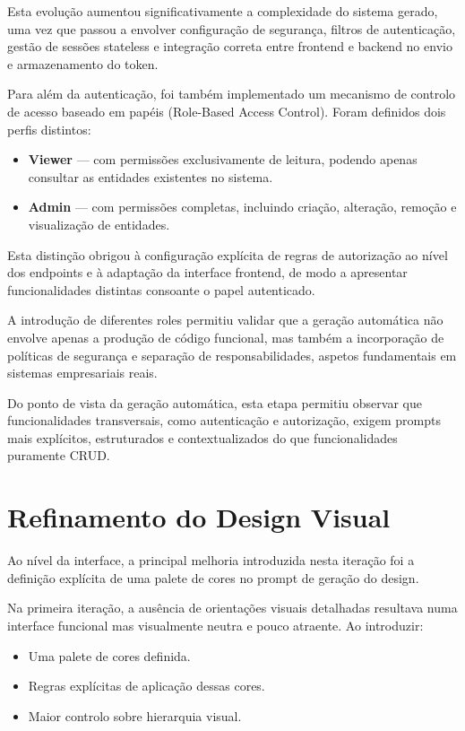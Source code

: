 Esta evolução aumentou significativamente a complexidade do sistema gerado, uma vez que passou a envolver configuração de segurança, filtros de autenticação, gestão de sessões stateless e integração correta entre frontend e backend no envio e armazenamento do token.

Para além da autenticação, foi também implementado um mecanismo de controlo de acesso baseado em papéis (Role-Based Access Control). Foram definidos dois perfis distintos:

\begin{itemize}
  \item \textbf{Viewer} — com permissões exclusivamente de leitura, podendo apenas consultar as entidades existentes no sistema.
  \item \textbf{Admin} — com permissões completas, incluindo criação, alteração, remoção e visualização de entidades.
\end{itemize}

Esta distinção obrigou à configuração explícita de regras de autorização ao nível dos endpoints e à adaptação da interface frontend, de modo a apresentar funcionalidades distintas consoante o papel autenticado.

A introdução de diferentes roles permitiu validar que a geração automática não envolve apenas a produção de código funcional, mas também a incorporação de políticas de segurança e separação de responsabilidades, aspetos fundamentais em sistemas empresariais reais.

Do ponto de vista da geração automática, esta etapa permitiu observar que funcionalidades transversais, como autenticação e autorização, exigem prompts mais explícitos, estruturados e contextualizados do que funcionalidades puramente CRUD.


\section{Refinamento do Design Visual}

Ao nível da interface, a principal melhoria introduzida nesta iteração foi a definição explícita de uma palete de cores no prompt de geração do design.

Na primeira iteração, a ausência de orientações visuais detalhadas resultava numa interface funcional mas visualmente neutra e pouco atraente. Ao introduzir:

\begin{itemize}
  \item Uma palete de cores definida.
  \item Regras explícitas de aplicação dessas cores.
  \item Maior controlo sobre hierarquia visual.
\end{itemize}

